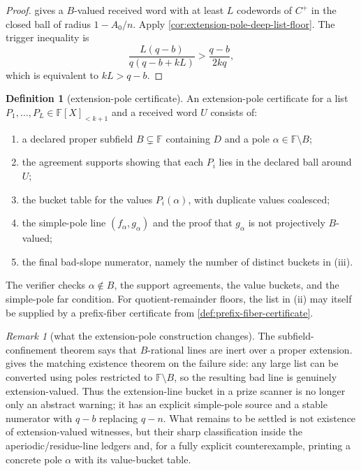 \documentclass[11pt]{article}
\theoremstyle{definition}
\newtheorem{definition}[definition]{Definition}
\theoremstyle{remark}
\newtheorem{remark}[remark]{Remark}
\newcommand{\F}{\mathbb{F}}
\newcommand{\B}{B}
\begin{document}
\begin{proof}
 gives a $\B$-valued received word with
at least $L$ codewords of $C^+$ in the closed ball of radius $1-A_0/n$.  Apply
\cref{cor:extension-pole-deep-list-floor}.  The trigger inequality is
\[
        \frac{L(q-b)}{q(q-b+kL)}>
        \frac{q-b}{2kq},
\]
which is equivalent to $kL>q-b$.
\end{proof}

\begin{definition}[extension-pole certificate]
\label{def:extension-pole-certificate}
An extension-pole certificate for a list $P_1,\ldots,P_L\in\F[X]_{<k+1}$ and a
received word $U$ consists of:
\begin{enumerate}[label=\textup{(\roman*)},leftmargin=2.2em]
\item a declared proper subfield $\B\subsetneq\F$ containing $D$ and a pole
$\alpha\in\F\setminus\B$;
\item the agreement supports showing that each $P_i$ lies in the declared ball
around $U$;
\item the bucket table for the values $P_i(\alpha)$, with duplicate values
coalesced;
\item the simple-pole line $(f_\alpha,g_\alpha)$ and the proof that
$g_\alpha$ is not projectively $\B$-valued;
\item the final bad-slope numerator, namely the number of distinct buckets in
\textup{(iii)}.
\end{enumerate}
The verifier checks $\alpha\notin\B$, the support agreements, the value buckets,
and the simple-pole far condition.  For quotient-remainder floors, the list in
\textup{(ii)} may itself be supplied by a prefix-fiber certificate from
\cref{def:prefix-fiber-certificate}.
\end{definition}

\begin{remark}[what the extension-pole construction changes]
\label{rem:extension-pole-status}
The subfield-confinement theorem says that $\B$-rational lines are inert over a
proper extension.   gives the matching
existence theorem on the failure side: any large list can be converted using
poles restricted to $\F\setminus\B$, so the resulting bad line is genuinely
extension-valued.  Thus the extension-line bucket in a prize scanner is no
longer only an abstract warning; it has an explicit simple-pole source and a
stable numerator with $q-b$ replacing $q-n$.  What remains to be settled is not existence
of extension-valued witnesses, but their sharp classification inside the
aperiodic/residue-line ledgers and, for a fully explicit counterexample, printing
a concrete pole $\alpha$ with its value-bucket table.
\end{remark}
\end{document}
